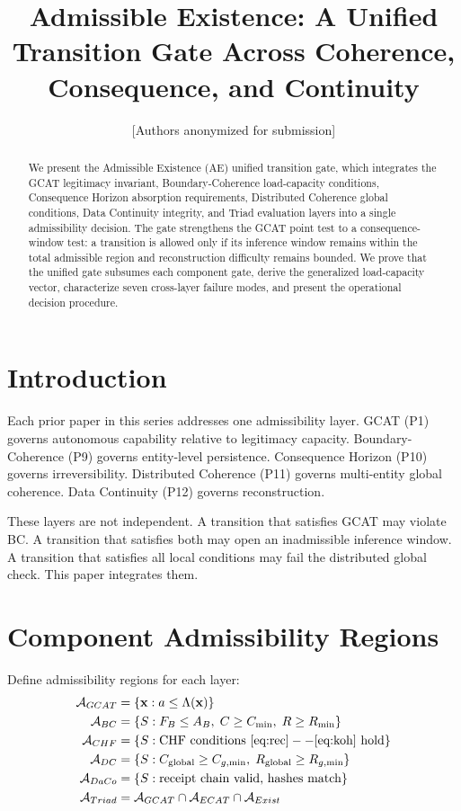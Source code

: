\documentclass[letterpaper,10pt,conference]{ieeeconf}
\title{\bf Admissible Existence: A Unified Transition Gate Across Coherence, Consequence, and Continuity}
\author{[Authors anonymized for submission]}
\newcommand{\x}{\mathbf{x}}
\newcommand{\A}{\mathcal{A}}
\newcommand{\Lam}{\Lambda}
\begin{document}
\maketitle
\thispagestyle{empty}
\pagestyle{empty}

\begin{abstract}
We present the Admissible Existence (AE) unified transition gate, which integrates the GCAT legitimacy invariant, Boundary-Coherence load-capacity conditions, Consequence Horizon absorption requirements, Distributed Coherence global conditions, Data Continuity integrity, and Triad evaluation layers into a single admissibility decision. The gate strengthens the GCAT point test to a consequence-window test: a transition is allowed only if its inference window remains within the total admissible region and reconstruction difficulty remains bounded. We prove that the unified gate subsumes each component gate, derive the generalized load-capacity vector, characterize seven cross-layer failure modes, and present the operational decision procedure.
\end{abstract}

\section{Introduction}
Each prior paper in this series addresses one admissibility layer. GCAT (P1) governs autonomous capability relative to legitimacy capacity. Boundary-Coherence (P9) governs entity-level persistence. Consequence Horizon (P10) governs irreversibility. Distributed Coherence (P11) governs multi-entity global coherence. Data Continuity (P12) governs reconstruction.

These layers are not independent. A transition that satisfies GCAT may violate BC. A transition that satisfies both may open an inadmissible inference window. A transition that satisfies all local conditions may fail the distributed global check. This paper integrates them.

\section{Component Admissibility Regions}

Define admissibility regions for each layer:
\begin{align*}
\A_{GCAT} &= \{\x : a \le \Lam(\x)\} \\
\A_{BC} &= \{S : F_B \le A_B,\; C \ge C_{\min},\; R \ge R_{\min}\} \\
\A_{CHF} &= \{S : \text{CHF conditions } \eqref{eq:rec}--\eqref{eq:koh} \text{ hold}\} \\
\A_{DC} &= \{S : C_{\text{global}} \ge C_{g,\min},\; R_{\text{global}} \ge R_{g,\min}\} \\
\A_{DaCo} &= \{S : \text{receipt chain valid, hashes match}\} \\
\A_{Triad} &= \A_{GCAT} \cap \A_{ECAT} \cap \A_{Exist}
\end{align*}
\end{document}
